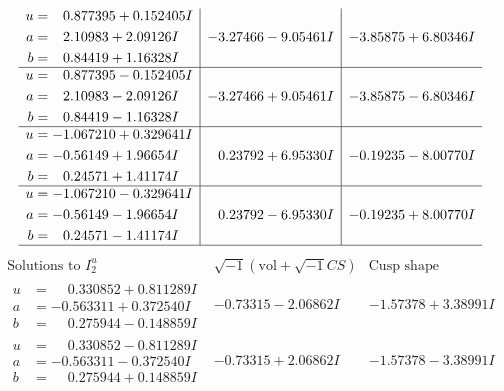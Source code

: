 \documentclass[1p]{elsarticle_modified}
\theoremstyle{definition}
\newcommand{\I}{\sqrt{-1}}
\begin{document}
$$\begin{array}{c|c|c}
\begin{aligned}
u &= \phantom{-}0.877395 + 0.152405 I \\
a &= \phantom{-}2.10983 + 2.09126 I \\
b &= \phantom{-}0.84419 + 1.16328 I\end{aligned}
 & -3.27466 - 9.05461 I & -3.85875 + 6.80346 I \\ \hline\begin{aligned}
u &= \phantom{-}0.877395 - 0.152405 I \\
a &= \phantom{-}2.10983 - 2.09126 I \\
b &= \phantom{-}0.84419 - 1.16328 I\end{aligned}
 & -3.27466 + 9.05461 I & -3.85875 - 6.80346 I \\ \hline\begin{aligned}
u &= -1.067210 + 0.329641 I \\
a &= -0.56149 + 1.96654 I \\
b &= \phantom{-}0.24571 + 1.41174 I\end{aligned}
 & \phantom{-}0.23792 + 6.95330 I & -0.19235 - 8.00770 I \\ \hline\begin{aligned}
u &= -1.067210 - 0.329641 I \\
a &= -0.56149 - 1.96654 I \\
b &= \phantom{-}0.24571 - 1.41174 I\end{aligned}
 & \phantom{-}0.23792 - 6.95330 I & -0.19235 + 8.00770 I\\
 \hline 
 \end{array}$$\newpage$$\begin{array}{c|c|c}  
\text{Solutions to }I^u_{2}& \I (\text{vol} + \sqrt{-1}CS) & \text{Cusp shape}\\
 \hline 
\begin{aligned}
u &= \phantom{-}0.330852 + 0.811289 I \\
a &= -0.563311 + 0.372540 I \\
b &= \phantom{-}0.275944 - 0.148859 I\end{aligned}
 & -0.73315 - 2.06862 I & -1.57378 + 3.38991 I \\ \hline\begin{aligned}
u &= \phantom{-}0.330852 - 0.811289 I \\
a &= -0.563311 - 0.372540 I \\
b &= \phantom{-}0.275944 + 0.148859 I\end{aligned}
 & -0.73315 + 2.06862 I & -1.57378 - 3.38991 I \\ \hline\begin{aligned}

\end{aligned}
\end{array}$$
\end{document}
